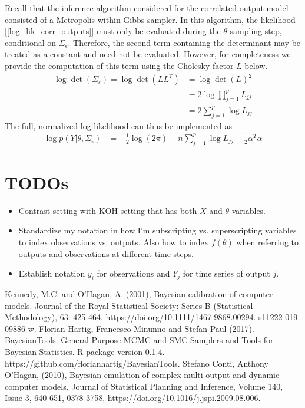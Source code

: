 \documentclass[12pt]{article}
\begin{document}
Recall that the inference algorithm considered for the correlated output model consisted of a Metropolis-within-Gibbs sampler. In this algorithm, the likelihood 
[\ref{log_lik_corr_outputs}] must only be evaluated during the $\theta$ sampling step, conditional on $\Sigma_\epsilon$. Therefore, the second term containing the 
determinant may be treated as a constant and need not be evaluated. However, for completeness we provide the computation of this term using the Cholesky 
factor $L$ below. 
\begin{align}
\log \det(\Sigma_\epsilon) = \log \det(LL^T) &= \log \det(L)^2 \\
								  &= 2 \log \prod_{j = 1}^{p} L_{jj} \\
								  &= 2 \sum_{j = 1}^{p} \log L_{jj}
\end{align}
The full, normalized log-likelihood can thus be implemented as
\begin{align}
\log p(Y|\theta, \Sigma_\epsilon) &= -\frac{1}{2} \log(2\pi) - n\sum_{j = 1}^{p} \log L_{jj}  - \frac{1}{2} \alpha^T \alpha
\end{align}


\section{TODOs}
\begin{itemize}
\item Contrast setting with KOH setting that has both $X$ and $\theta$ variables. 
\item Standardize my notation in how I'm subscripting vs. superscripting variables to index observations vs. outputs. Also how to 
index $f(\theta)$ when referring to outputs and observations at different time steps. 
\item Establish notation $y_i$ for observations and $Y_j$ for time series of output $j$. 
\end{itemize}

\begin{thebibliography}{20}
 Kennedy, M.C. and O'Hagan, A. (2001), Bayesian calibration of computer models. Journal of the Royal Statistical Society: Series B (Statistical Methodology), 63: 425-464. https://doi.org/10.1111/1467-9868.00294.
s11222-019-09886-w.
 Florian Hartig, Francesco Minunno and Stefan Paul (2017). BayesianTools: General-Purpose MCMC and SMC Samplers and Tools for Bayesian Statistics. R package version 0.1.4. https://github.com/florianhartig/BayesianTools.
 Stefano Conti, Anthony O’Hagan, (2010), Bayesian emulation of complex multi-output and dynamic computer models, Journal of Statistical Planning and Inference,
Volume 140, Issue 3, 640-651, 0378-3758, https://doi.org/10.1016/j.jspi.2009.08.006.
\end{thebibliography}
\end{document}
